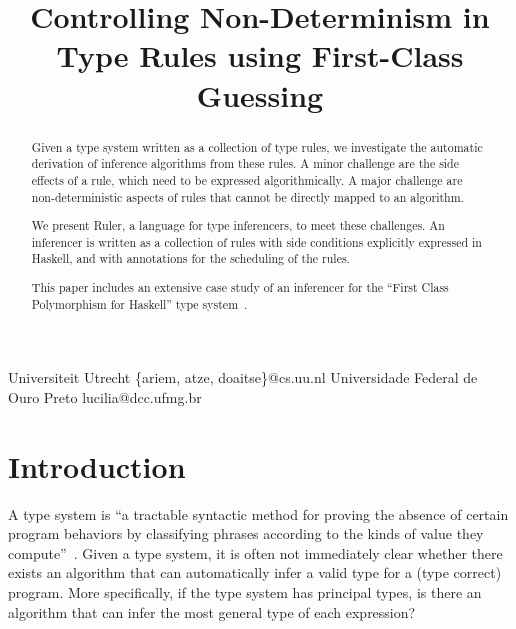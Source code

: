\documentclass[preprint,natbib]{sigplanconf}
\begin{document}
\copyrightdata{[to be supplied]}


\title{Controlling Non-Determinism in Type Rules using First-Class Guessing}

           {Universiteit Utrecht}
           {\{ariem, atze, doaitse\}@cs.uu.nl}
           {Universidade Federal de Ouro Preto}
           {lucilia@dcc.ufmg.br}

\maketitle

\begin{abstract} 
Given a type system written as a collection of type rules, we
investigate the automatic derivation of inference algorithms
from these rules.
A minor challenge are the side effects of a rule, which need to
be expressed algorithmically. A major challenge are
non-deterministic aspects of rules that cannot be directly mapped
to an algorithm.

We present Ruler, a language for type inferencers, to meet these
challenges. An inferencer is written as a collection of rules
with side conditions explicitly expressed in Haskell, and with
annotations for the scheduling of the rules.

This paper includes an extensive case study of an inferencer
for the ``First Class Polymorphism for Haskell'' type
system~\cite{DBLP:conf/icfp/VytiniotisWJ08}.
\end{abstract}




\section{Introduction}

A type system is ``a tractable syntactic method for proving the absence
of certain program behaviors by classifying phrases according to the
kinds of value they compute''~\cite{509043}. Given a type
system, it is often not immediately clear whether there exists an algorithm that can
automatically infer a valid type for a (type correct) program. More
specifically, if the type system has principal types, is there an
algorithm that can infer the most general type of each expression? 
\end{document}
